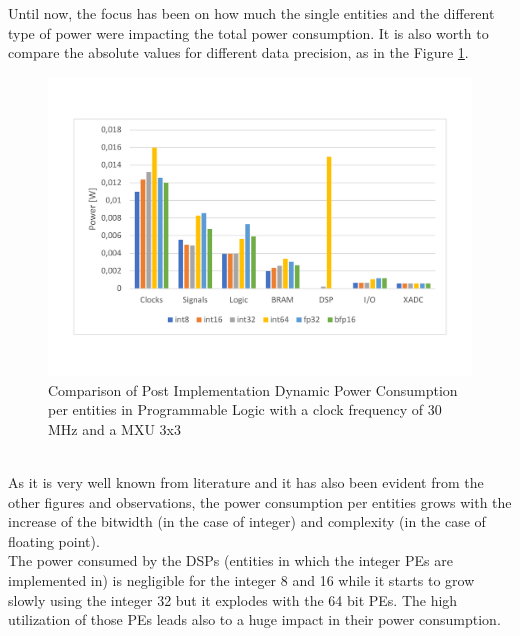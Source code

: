 \newpage
Until now, the focus has been on how much the single entities and the different type of power were impacting the total power consumption. It is also worth to compare the absolute values for different data precision, as in the Figure \ref{fig:dynpowcomparisonent3033}.\\
\begin{figure}[!htbp]
\centering
\captionsetup{justification=centering}
\includegraphics[scale=0.5,angle=0]{./figure/graphs/power_dyn_comparison_pes_30mhz_3x3.pdf}
\caption{Comparison of Post Implementation Dynamic Power Consumption per entities in Programmable Logic with a clock frequency of 30 MHz and a MXU 3x3}
\label{fig:dynpowcomparisonent3033}
\end{figure}\\
As it is very well known from literature and it has also been evident from the other figures and observations, the power consumption per entities grows with the increase of the bitwidth (in the case of integer) and complexity (in the case of floating point).\\
The power consumed by the DSPs (entities in which the integer PEs are implemented in) is negligible for the integer 8 and 16 while it starts to grow slowly using the integer 32 but it explodes with the 64 bit PEs. The high utilization of those PEs leads also to a huge impact in their power consumption.


\newpage

